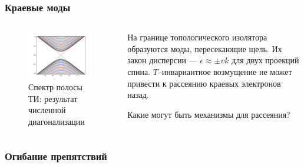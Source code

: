 \documentclass{beamer}
\begin{document}
\begin{frame}
    \frametitle{Краевые моды}
    \begin{columns}[T]
        \begin{column}{0.5\textwidth}
            \begin{figure}[h]
                \includegraphics[width=0.95\linewidth]{edge_states.png}
                \caption{Спектр полосы ТИ: результат численной диагонализации}
            \end{figure}
        \end{column}
        \begin{column}{0.5\textwidth}
            На границе топологического изолятора образуются моды, пересекающие щель.
            Их закон дисперсии --- $\epsilon \approx \pm vk$ для двух проекций спина. 
            $T$--инвариантное возмущение не может привести к рассеянию краевых 
            электронов назад.
    
            Какие могут быть механизмы для рассеяния?
        \end{column}
    \end{columns}
\end{frame}

\begin{frame}
    \frametitle{Огибание препятствий}
    
\end{frame}
\end{document}
